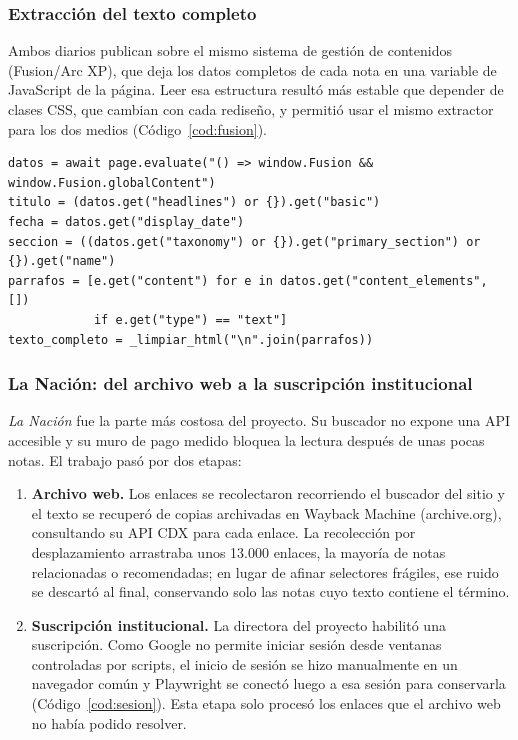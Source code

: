 \documentclass[11pt,a4paper]{article}
\newcommand{\lanac}{\textit{La Nación}}
\begin{document}
\subsubsection{Extracción del texto completo}

Ambos diarios publican sobre el mismo sistema de gestión de contenidos (Fusion/Arc XP), que deja los datos completos de cada nota en una variable de JavaScript de la página. Leer esa estructura resultó más estable que depender de clases CSS, que cambian con cada rediseño, y permitió usar el mismo extractor para los dos medios (Código~\ref{cod:fusion}).

\begin{lstlisting}[caption={Lectura de los datos de una nota desde la estructura de Fusion/Arc XP.}, label=cod:fusion]
datos = await page.evaluate("() => window.Fusion && window.Fusion.globalContent")
titulo = (datos.get("headlines") or {}).get("basic")
fecha = datos.get("display_date")
seccion = ((datos.get("taxonomy") or {}).get("primary_section") or {}).get("name")
parrafos = [e.get("content") for e in datos.get("content_elements", [])
            if e.get("type") == "text"]
texto_completo = _limpiar_html("\n".join(parrafos))
\end{lstlisting}

\subsubsection{La Nación: del archivo web a la suscripción institucional}

\lanac{} fue la parte más costosa del proyecto. Su buscador no expone una API accesible y su muro de pago medido bloquea la lectura después de unas pocas notas. El trabajo pasó por dos etapas:
\begin{enumerate}
  \item \textbf{Archivo web.} Los enlaces se recolectaron recorriendo el buscador del sitio y el texto se recuperó de copias archivadas en Wayback Machine (archive.org), consultando su API CDX para cada enlace. La recolección por desplazamiento arrastraba unos 13.000 enlaces, la mayoría de notas relacionadas o recomendadas; en lugar de afinar selectores frágiles, ese ruido se descartó al final, conservando solo las notas cuyo texto contiene el término.
  \item \textbf{Suscripción institucional.} La directora del proyecto habilitó una suscripción. Como Google no permite iniciar sesión desde ventanas controladas por scripts, el inicio de sesión se hizo manualmente en un navegador común y Playwright se conectó luego a esa sesión para conservarla (Código~\ref{cod:sesion}). Esta etapa solo procesó los enlaces que el archivo web no había podido resolver.
\end{enumerate}
\end{document}
